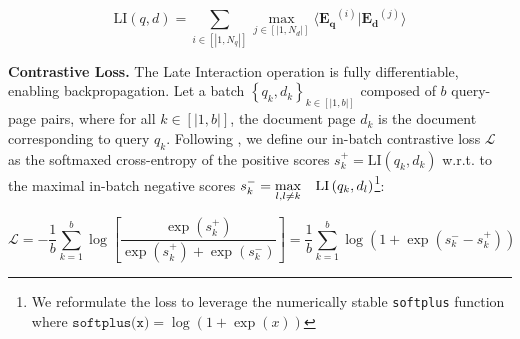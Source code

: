 \documentclass{article} %
\newcommand{\code}[1]{\texttt{#1}}
\begin{document}
\begin{equation}
    \text{LI} \left( q, d \right) = \sum_{i \in [|1, N_q|]} \max_{j \in [|1, N_d|]} \langle \mathbf{E_{q}}^{(i)} | \mathbf{E_{d}}^{(j)} \rangle
\label{eq:colbert_maxsim_score}
\end{equation}


\noindent\textbf{Contrastive Loss.}
The Late Interaction operation is fully differentiable, enabling backpropagation.
Let a batch $\left\{ q_k, d_k \right\}_{k \in [|1, b |]}$ composed of $b$ query-page pairs, where for all $k \in [|1, b|]$, the document page $d_k$ is the document corresponding to query $q_k$. 
Following \citet{khattab_colbert_2020}, we define our in-batch contrastive loss $\mathcal{L}$ as the softmaxed cross-entropy of the positive scores $s_k^+ = \text{LI} \left( q_k, d_k \right)$ w.r.t. to the maximal in-batch negative scores $s_k^- = \max \limits_{l, l \neq k} \hspace{3mm} \text{LI} \left( q_k, d_l \right) $\footnote{We reformulate the loss to leverage the numerically stable \code{softplus} function where $\code{softplus(x)} =  \log \left( 1 + \exp \left( x \right)\right)$}:





\begin{equation}
    \mathcal{L} = -\frac{1}{b} \sum_{k=1}^{b} \log \left[ \frac{\exp \left( s_k^+ \right)}{\exp \left( s_k^+ \right) + \exp \left( s_k^- \right)} \right] = \frac{1}{b} \sum_{k=1}^{b} \log \left( 1 + \exp \left( s_k^- - s_k^+ \right) \right)
    \label{equation:colpali_loss_full}
\end{equation}
\end{document}
